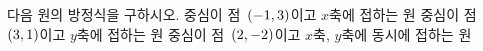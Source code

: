 다음 원의 방정식을 구하시오.
 중심이 점~$(-1{,}\mkern3mu\mathopen{}3)$이고 $x$축에 접하는 원
 중심이 점~$(3{,}\mkern3mu\mathopen{}1)$이고 $y$축에 접하는 원
 중심이 점~$(2{,}\mkern3mu\mathopen{}-2)$이고 $x$축, $y$축에 동시에 접하는 원
